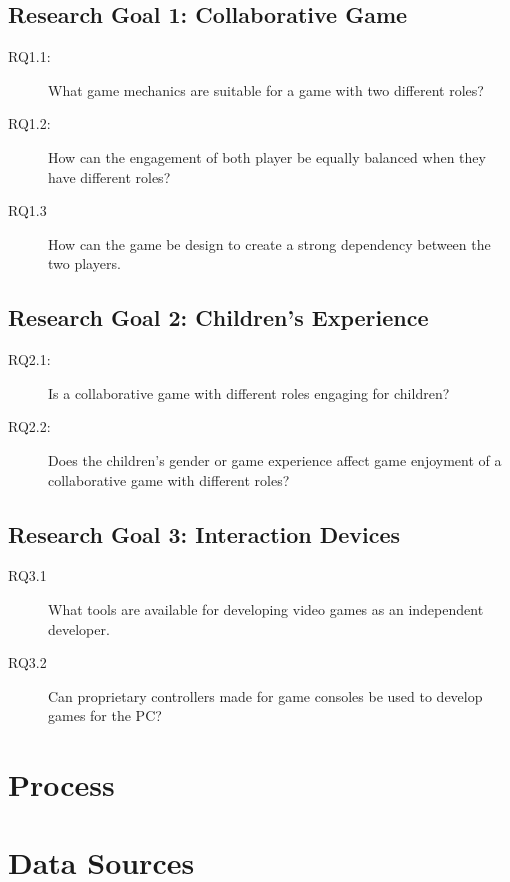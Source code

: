 \subsection{Research Goal 1: Collaborative Game}
\begin{description}
	\item[RQ1.1:] What game mechanics are suitable for a game with two different roles?
	\item[RQ1.2:] How can the engagement of both player be equally balanced when they have different roles?
	\item[RQ1.3] How can the game be design to create a strong dependency between the two players.
\end{description}
\subsection{Research Goal 2: Children's Experience}
\begin{description}
	\item[RQ2.1:] Is a collaborative game with different roles engaging for children?
	\item[RQ2.2:] Does the children's gender or game experience affect game enjoyment of a collaborative game with different roles?
\end{description}
\subsection{Research Goal 3: Interaction Devices}
\begin{description}
	\item[RQ3.1] What tools are available for developing video games as an independent developer.
	\item[RQ3.2] Can proprietary controllers made for game consoles be used to develop games for the PC?
\end{description}
	

\section{Process}


\section{Data Sources}
